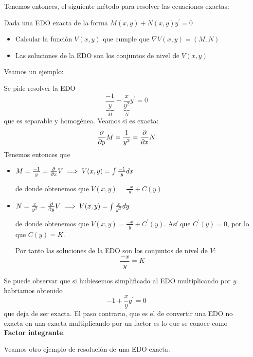Tenemos entonces, el siguiente método para resolver las ecuaciones exactas:
\begin{method}
Dada una EDO exacta de la forma $M(x,y) + N(x,y)y^\prime = 0$
\begin{itemize}
\item Calcular la función $V(x,y)$ que cumple que $\nabla V(x,y) = (M,N)$
\item Las soluciones de la EDO son los conjuntos de nivel de $V(x,y)$
\end{itemize}
\end{method}

Veamos un ejemplo:

\begin{example}
Se pide resolver la EDO $$\underbrace{\frac{-1}{y}}_M+\underbrace{\frac{x}{y^2}}_Ny^\prime = 0$$ que es separable y homogénea.
Veamos si es exacta: $$\frac{\partial}{\partial y}M = \frac{1}{y^2} = \frac{\partial}{\partial x}N$$
Tenemos entonces que
\begin{itemize}
\item $M = \frac{-1}{y} = \frac{\partial}{\partial x}V \implies V(x,y) = \int \frac{-1}{y}dx$

de donde obtenemos que $V(x,y) = \frac{-x}{y} + C(y)$

\item $N = \frac{x}{y^2} = \frac{\partial}{\partial y}V \implies V(x,y) = \int \frac{x}{y^2}dy$

de donde obtenemos que $V(x,y) = \frac{-x}{y} + C^\prime(y)$. Así que $C^\prime(y) = 0$, por lo que $C(y) = K$.

Por tanto las soluciones de la EDO son los conjuntos de nivel de $V$: $$\frac{-x}{y} = K$$
\end{itemize}

Se puede observar que si hubiesemos simplificado al EDO multiplicando por $y$ habriamos obtenido $$-1+\frac{x}{y}y^\prime = 0$$ que deja de ser exacta. El paso contrario, que es el de convertir una EDO no exacta en una exacta multiplicando por un factor es lo que se conoce como \textbf{Factor integrante}.
\end{example}

Veamos otro ejemplo de resolución de una EDO exacta.

